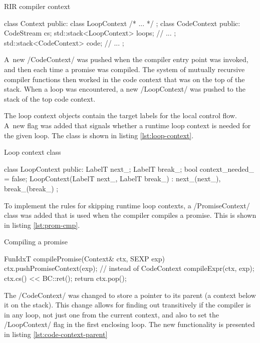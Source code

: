 \begin{listing}[htbp]
  \caption{\label{lst:context}RIR compiler context}
  \begin{cppcode}
class Context {
  public:
    class LoopContext { /* ... */ };
    class CodeContext {
      public:
        CodeStream cs;
        std::stack<LoopContext> loops;
        // ...
    };
    std::stack<CodeContext> code;
    // ...
};
  \end{cppcode}
\end{listing}

A~new \cppinline/CodeContext/ was pushed when the compiler entry point was invoked, and then each time a promise was compiled. The system of mutually recursive compiler functions then worked in the code context that was on the top of the stack. When a loop was encountered, a new \cppinline/LoopContext/ was pushed to the stack of the top code context.

The loop context objects contain the target labels for the local control flow. A~new flag was added that signals whether a runtime loop context is needed for the given loop. The class is shown in listing \ref{lst:loop-context}.

\begin{listing}[htbp]
  \caption{\label{lst:loop-context}Loop context class}
  \begin{cppcode}
class LoopContext {
  public:
    LabelT next_;
    LabelT break_;
    bool context_needed_ = false;
    LoopContext(LabelT next_, LabelT break_)
        : next_(next_), break_(break_) {}
};
  \end{cppcode}
\end{listing}

To implement the rules for skipping runtime loop contexts, a \cppinline/PromiseContext/ class was added that is used when the compiler compiles a promise. This is shown in listing \ref{lst:prom-cmp}.

\begin{listing}[htbp]
  \caption{\label{lst:prom-cmp}Compiling a promise}
  \begin{cppcode}
FunIdxT compilePromise(Context& ctx, SEXP exp) {
    ctx.pushPromiseContext(exp);  // instead of CodeContext
    compileExpr(ctx, exp);
    ctx.cs() << BC::ret();
    return ctx.pop();
}
  \end{cppcode}
\end{listing}

The \cppinline/CodeContext/ was changed to store a pointer to its parent (a context below it on the stack). This change allows for finding out transitively if the compiler is in any loop, not just one from the current context, and also to set the \cppinline/LoopContext/ flag in the first enclosing loop. The new functionality is presented in listing \ref{lst:code-context-parent}

